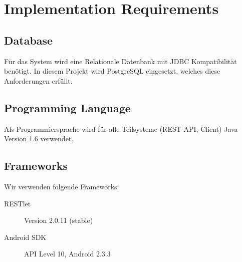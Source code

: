 \documentclass[10pt,a4paper]{scrartcl}
\begin{document}
\section{Implementation Requirements}

	\subsection{Database}

	Für das System wird eine Relationale Datenbank mit JDBC Kompatibilität benötigt.
	In diesem Projekt wird PostgreSQL eingesetzt, welches diese Anforderungen erfüllt.

	\subsection{Programming Language}

	Als Programmiersprache wird für alle Teilsysteme (REST-API, Client) Java Version 1.6 verwendet.

	\subsection{Frameworks}

	Wir verwenden folgende Frameworks:

	\begin{description}
		\item[RESTlet] Version 2.0.11 (stable)
		\item[Android SDK] API Level 10, Android 2.3.3 
	\end{description}




\end{document}

